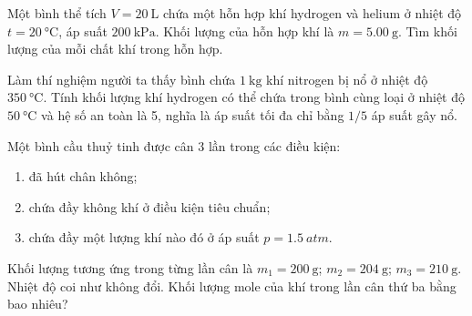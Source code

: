 \begin{ex}
	Một bình thể tích $V=\SI{20}{\liter}$ chứa một hỗn hợp khí hydrogen và helium ở nhiệt độ $t=\SI{20}{\celsius}$, áp suất $\SI{200}{\kilo\pascal}$. Khối lượng của hỗn hợp  khí là $m=\SI{5.00}{\gram}$. Tìm khối lượng của mỗi chất khí trong hỗn hợp.
	
\end{ex}
\begin{ex}
	Làm thí nghiệm người ta thấy bình chứa $\SI{1}{\kilogram}$ khí nitrogen bị nổ ở nhiệt độ $\SI{350}{\celsius}$. Tính khối lượng khí hydrogen có thể chứa trong bình cùng loại ở nhiệt độ $\SI{50}{\celsius}$ và hệ số an toàn là 5, nghĩa là áp suất tối đa chỉ bằng $1/5$ áp suất gây nổ.
\end{ex}
\begin{ex}
	Một bình cầu thuỷ tinh được cân 3 lần trong các điều kiện:
	\begin{enumerate}[label=\alph*)]
		\item đã hút chân không;
		\item chứa đầy không khí ở điều kiện tiêu chuẩn;
		\item chứa đầy một lượng khí nào đó ở áp suất $p=\SI{1.5}{atm}$.
	\end{enumerate}
	Khối lượng tương ứng trong từng lần cân là $m_1=\SI{200}{\gram}$; $m_2=\SI{204}{\gram}$; $m_3=\SI{210}{\gram}$.
	Nhiệt độ coi như không đổi. Khối lượng mole của khí trong lần cân thứ ba bằng bao nhiêu?
	
\end{ex}
